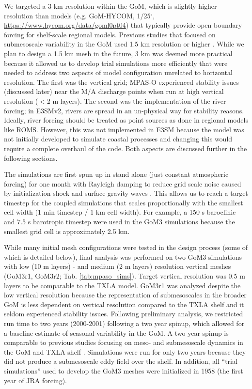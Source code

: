 We targeted a 3 km resolution within the GoM, which is slightly higher resolution than models (e.g. GoM-HYCOM, 1/25$^\circ$, \url{https://www.hycom.org/data/goml0pt04}) that typically provide open boundary forcing for shelf-scale regional models. Previous studies that focused on submesoscale variability in the GoM used 1.5 km resolution or higher \citep{barkan2017submesoscalepart2, bracco2019mesoscale, liu2021submesoscale}. While we plan to design a 1.5 km mesh in the future, 3 km was deemed more practical because it allowed us to develop trial simulations more efficiently that were needed to address two aspects of model configuration unrelated to horizontal resolution. The first was the vertical grid; MPAS-O experienced stability issues (discussed later) near the M/A discharge points when run at high vertical resolution ($<$2 m layers). The second was the implementation of the river forcing; in E3SMv2, rivers are spread in an un-physical way for stability reasons. Ideally, river forcing should be treated as point sources as done in regional models like ROMS. However, this was not implemented in E3SM because the model was not initially developed to simulate coastal processes and changing this would require a complete overhaul of the code. Both aspects are discussed further in the following sections. 

The simulations are first spun up in stand alone (just constant atmospheric forcing) for one month with Rayleigh damping to reduce grid scale noise caused by initialization shock and surface gravity waves \cite{petersen2018mpas}. This allows us to reach a target timestep for the coupled simulations that scales proportionally with the smallest cell width (1 min timestep / 1 km cell width). For example, a 150 s baroclinic and 7.5 s barotropic timestep were used in the GoM3 simulations because the smallest grid cell is approximately 2.5 km.

While many initial mesh configurations were tested in the design process (some of which is detailed below), final analysis was performed on two GoM3 simulations with low (10 m layers) - and medium (2 m layers) resolution vertical meshes (GoM3r1, GoM3r2; Tab. \ref{tab:mpaso_sims}). Target vertical resolution was 0.5 m layers to be comparable to the TXLA model. GoM3r1 was analyzed despite the low vertical resolution because the representation of submesoscales in the broader GoM is less dependent on vertical resolution compared to the TXLA shelf and it seldom experienced stability issues. Following preliminary analysis, we restricted run time to two years (2000-2001) following a two year spinup, which allowed for a baseline estimate of seasonal variability in the GoM. A two year spinup is comparable to previous studies focusing on meso- and submesoscale dynamics in the GoM and TXLA shelf \citep{Barkan_2017, Kobashi_2020}. Simulations were run for only two years because they did not produce a submesoscale eddy field over the shelf.  In addition, all ``trial simulations'' used to develop the GoM3 meshes were initialized in 1958 (the first year of JRA forcing).

